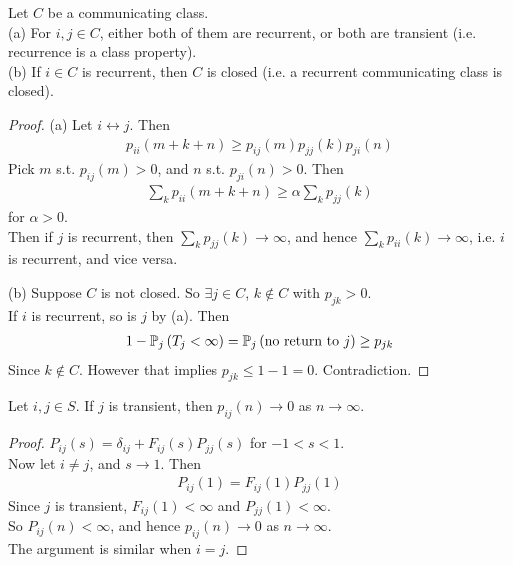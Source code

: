 \documentclass[a4paper]{article}
\begin{document}
\begin{thm}
Let $C$ be a communicating class.\\
(a) For $i,j \in C$, either both of them are recurrent, or both are transient (i.e. recurrence is a class property).\\
(b) If $i\in C$ is recurrent, then $C$ is closed (i.e. a recurrent communicating class is closed).
\begin{proof}
(a) Let $i \leftrightarrow j$. Then
\begin{equation*}
\begin{aligned}
p_{ii}\left(m+k+n\right) \geq p_{ij}\left(m\right)p_{jj}\left(k\right)p_{ji}\left(n\right)
\end{aligned}
\end{equation*}
Pick $m$ s.t. $p_{ij}\left(m\right)>0$, and $n$ s.t. $p_{ji}\left(n\right)>0$. Then
\begin{equation*}
\begin{aligned}
\sum_k p_{ii}\left(m+k+n\right) \geq \alpha\sum_k p_{jj}\left(k\right)
\end{aligned}
\end{equation*}
for $\alpha > 0$.\\
Then if $j$ is recurrent, then $\sum_k p_{jj}\left(k\right) \to \infty$, and hence $\sum_k p_{ii}\left(k\right) \to \infty$, i.e. $i$ is recurrent, and vice versa.

(b) Suppose $C$ is not closed. So $\exists j \in C$, $k \not\in C$ with $p_{jk} > 0$.\\
If $i$ is recurrent, so is $j$ by (a). Then
\begin{equation*}
\begin{aligned}
1 - \P_j\left(T_j<\infty\right) = \P_j \left(\text{no return to } j\right) \geq p_{jk}
\end{aligned}
\end{equation*}
Since $k \not\in C$. However that implies $p_{jk} \leq 1-1 = 0$. Contradiction.
\end{proof}
\end{thm}

\begin{prop}
Let $i,j\in S$. If $j$ is transient, then $p_{ij}\left(n\right) \to 0$ as $n \to \infty$.
\begin{proof}
$P_{ij}\left(s\right) = \delta_{ij} + F_{ij}\left(s\right) P_{jj}\left(s\right)$ for $-1 <s<1$.\\
Now let $i \neq j$, and $s \to 1$. Then
\begin{equation*}
\begin{aligned}
P_{ij}\left(1\right) = F_{ij}\left(1\right) P_{jj}\left(1\right)
\end{aligned}
\end{equation*}
Since $j$ is transient, $F_{ij}\left(1\right) < \infty$ and $P_{jj}\left(1\right) < \infty$.\\
So $P_{ij}\left(n\right) < \infty$, and hence $p_{ij}\left(n\right) \to 0$ as $n \to \infty$.\\
The argument is similar when $i=j$.
\end{proof}
\end{prop}
\end{document}
